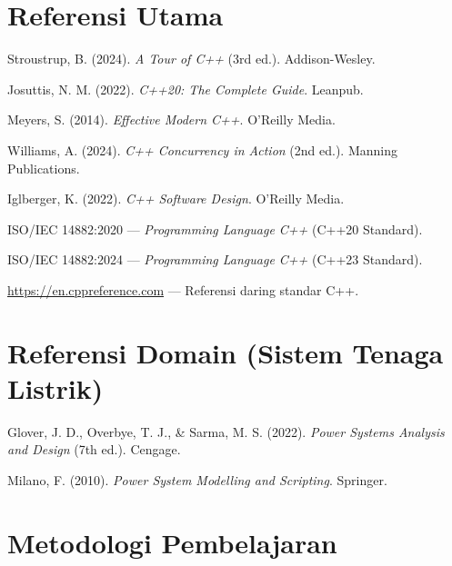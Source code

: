 \documentclass[12pt,a4paper]{article}
\begin{document}
\section*{Referensi Utama}

\begin{enumerate}[label={[\arabic*]}, itemsep=0.3cm]
    \item Stroustrup, B. (2024). \textit{A Tour of C++} (3rd ed.). Addison-Wesley.
    \item Josuttis, N. M. (2022). \textit{C++20: The Complete Guide}. Leanpub.
    \item Meyers, S. (2014). \textit{Effective Modern C++}. O'Reilly Media.
    \item Williams, A. (2024). \textit{C++ Concurrency in Action} (2nd ed.). Manning Publications.
    \item Iglberger, K. (2022). \textit{C++ Software Design}. O'Reilly Media.
    \item ISO/IEC 14882:2020 --- \textit{Programming Language C++} (C++20 Standard).
    \item ISO/IEC 14882:2024 --- \textit{Programming Language C++} (C++23 Standard).
    \item \url{https://en.cppreference.com} --- Referensi daring standar C++.
\end{enumerate}

\section*{Referensi Domain (Sistem Tenaga Listrik)}

\begin{enumerate}[label={[\arabic*]}, start=9, itemsep=0.3cm]
    \item Glover, J. D., Overbye, T. J., \& Sarma, M. S. (2022). \textit{Power Systems Analysis and Design} (7th ed.). Cengage.
    \item Milano, F. (2010). \textit{Power System Modelling and Scripting}. Springer.
\end{enumerate}

\section*{Metodologi Pembelajaran}
\end{document}
